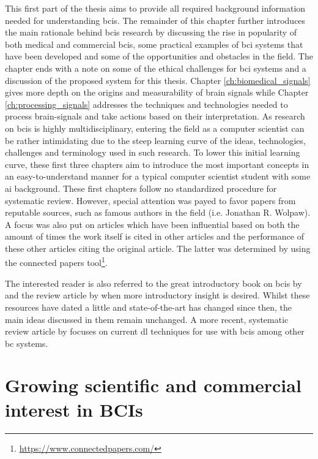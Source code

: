 This first part of the thesis aims to provide all required background information needed for understanding \glspl{bci}.
The remainder of this chapter further introduces the main rationale behind \glspl{bci} research by discussing the rise in popularity of both medical and commercial \glspl{bci}, some practical examples of \gls{bci} systems that have been developed and some of the opportunities and obstacles in the field. The chapter ends with a note on some of the ethical challenges for \gls{bci} systems and a discussion of the proposed system for this thesis.
Chapter \ref{ch:biomedical_signals} gives more depth on the origins and measurability of brain signals while Chapter \ref{ch:processing_signals} addresses the techniques and technologies needed to process brain-signals and take actions based on their interpretation. 
As research on \glspl{bci} is highly multidisciplinary, entering the field as a computer scientist can be rather intimidating due to the steep learning curve of the ideas, technologies, challenges and terminology used in such research.
To lower this initial learning curve, these first three chapters aim to introduce the most important concepts in an easy-to-understand manner for a typical computer scientist student with some \gls{ai} background.
These first chapters follow no standardized procedure for systematic review.
However, special attention was payed to favor papers from reputable sources, such as famous authors in the field (i.e. Jonathan R. Wolpaw).
A focus was also put on articles which have been influential based on both the amount of times the work itself is cited in other articles and the performance of these other articles citing the original article.
The latter was determined by using the connected papers tool\footnote{\url{https://www.connectedpapers.com/}}.

The interested reader is also referred to the great introductory book on \glspl{bci} by \citet{bci_book} and the review article by \citet{bci_review} when more introductory insight is desired.
Whilst these resources have dated a little and state-of-the-art has changed since then, the main ideas discussed in them remain unchanged.
A more recent, systematic review article by \citet{bci_review_arnau} focuses on current \gls{dl} techniques for use with \glspl{bci} among other \gls{bc} systems.



\section{Growing scientific and commercial interest in BCIs}
\label{sec:bci_gaining_popularity}

